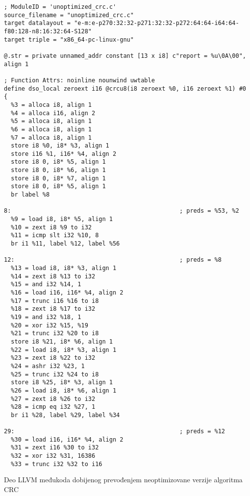 \documentclass[12pt,oneside]{memoir}
\begin{document}
\begin{listing}
\begin{verbatim}
; ModuleID = 'unoptimized_crc.c'
source_filename = "unoptimized_crc.c"
target datalayout = "e-m:e-p270:32:32-p271:32:32-p272:64:64-i64:64-f80:128-n8:16:32:64-S128"
target triple = "x86_64-pc-linux-gnu"

@.str = private unnamed_addr constant [13 x i8] c"report = %u\0A\00", align 1

; Function Attrs: noinline nounwind uwtable
define dso_local zeroext i16 @crcu8(i8 zeroext %0, i16 zeroext %1) #0 {
  %3 = alloca i8, align 1
  %4 = alloca i16, align 2
  %5 = alloca i8, align 1
  %6 = alloca i8, align 1
  %7 = alloca i8, align 1
  store i8 %0, i8* %3, align 1
  store i16 %1, i16* %4, align 2
  store i8 0, i8* %5, align 1
  store i8 0, i8* %6, align 1
  store i8 0, i8* %7, align 1
  store i8 0, i8* %5, align 1
  br label %8

8:                                                ; preds = %53, %2
  %9 = load i8, i8* %5, align 1
  %10 = zext i8 %9 to i32
  %11 = icmp slt i32 %10, 8
  br i1 %11, label %12, label %56

12:                                               ; preds = %8
  %13 = load i8, i8* %3, align 1
  %14 = zext i8 %13 to i32
  %15 = and i32 %14, 1
  %16 = load i16, i16* %4, align 2
  %17 = trunc i16 %16 to i8
  %18 = zext i8 %17 to i32
  %19 = and i32 %18, 1
  %20 = xor i32 %15, %19
  %21 = trunc i32 %20 to i8
  store i8 %21, i8* %6, align 1
  %22 = load i8, i8* %3, align 1
  %23 = zext i8 %22 to i32
  %24 = ashr i32 %23, 1
  %25 = trunc i32 %24 to i8
  store i8 %25, i8* %3, align 1
  %26 = load i8, i8* %6, align 1
  %27 = zext i8 %26 to i32
  %28 = icmp eq i32 %27, 1
  br i1 %28, label %29, label %34

29:                                               ; preds = %12
  %30 = load i16, i16* %4, align 2
  %31 = zext i16 %30 to i32
  %32 = xor i32 %31, 16386
  %33 = trunc i32 %32 to i16
\end{verbatim}
\caption{Deo LLVM međukoda dobijenog prevođenjem neoptimizovane verzije algoritma CRC}
\label{syrmia_unopt_crc_ir}
\centering
\end{listing}
\end{document}
